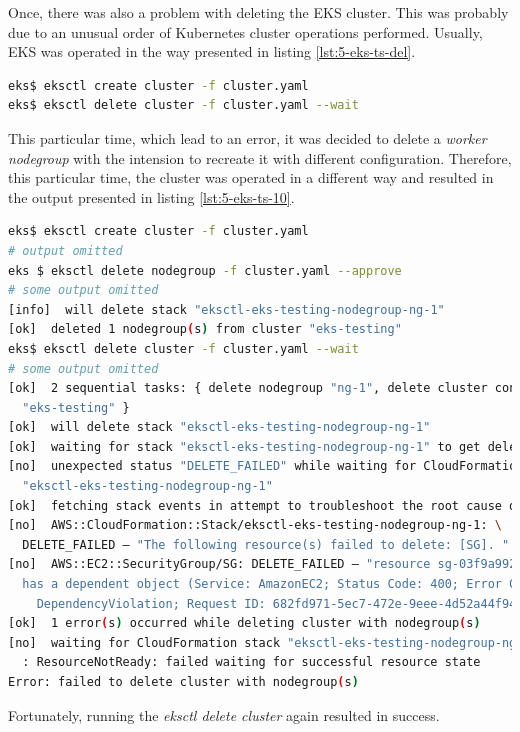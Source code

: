 Once, there was also a problem with deleting the EKS cluster. This was probably due to an unusual order of Kubernetes cluster operations performed. Usually, EKS was operated in the way presented in listing \ref{lst:5-eks-ts-del}.
\begin{lstlisting}[basicstyle=\scriptsize,xleftmargin=0cm,label=lst:5-eks-ts-del,caption={Deleting \textit{eksctl} cluster},captionpos=b,language=Bash ]
eks$ eksctl create cluster -f cluster.yaml
eks$ eksctl delete cluster -f cluster.yaml --wait
\end{lstlisting}
This particular time, which lead to an error, it was decided to delete a \textit{worker nodegroup} with the intension to recreate it with different configuration. Therefore, this particular time, the cluster was operated in a different way and resulted in the output presented in listing \ref{lst:5-eks-ts-10}.
\begin{lstlisting}[basicstyle=\scriptsize,xleftmargin=0cm,label=lst:5-eks-ts-10,caption={\textit{Eksctl} special operations},captionpos=b,language=Bash,showstringspaces=false]
eks$ eksctl create cluster -f cluster.yaml
# output omitted
eks $ eksctl delete nodegroup -f cluster.yaml --approve
# some output omitted
[info]  will delete stack "eksctl-eks-testing-nodegroup-ng-1"
[ok]  deleted 1 nodegroup(s) from cluster "eks-testing"
eks$ eksctl delete cluster -f cluster.yaml --wait
# some output omitted
[ok]  2 sequential tasks: { delete nodegroup "ng-1", delete cluster control plane\
  "eks-testing" }
[ok]  will delete stack "eksctl-eks-testing-nodegroup-ng-1"
[ok]  waiting for stack "eksctl-eks-testing-nodegroup-ng-1" to get deleted
[no]  unexpected status "DELETE_FAILED" while waiting for CloudFormation stack\
  "eksctl-eks-testing-nodegroup-ng-1"
[ok]  fetching stack events in attempt to troubleshoot the root cause of the failure
[no]  AWS::CloudFormation::Stack/eksctl-eks-testing-nodegroup-ng-1: \
  DELETE_FAILED – "The following resource(s) failed to delete: [SG]. "
[no]  AWS::EC2::SecurityGroup/SG: DELETE_FAILED – "resource sg-03f9a9928f765ecae\
  has a dependent object (Service: AmazonEC2; Status Code: 400; Error Code:\
    DependencyViolation; Request ID: 682fd971-5ec7-472e-9eee-4d52a44f9455)"
[ok]  1 error(s) occurred while deleting cluster with nodegroup(s)
[no]  waiting for CloudFormation stack "eksctl-eks-testing-nodegroup-ng-1"\
  : ResourceNotReady: failed waiting for successful resource state
Error: failed to delete cluster with nodegroup(s)
\end{lstlisting}
Fortunately, running the \textit{eksctl delete cluster} again resulted in success.


